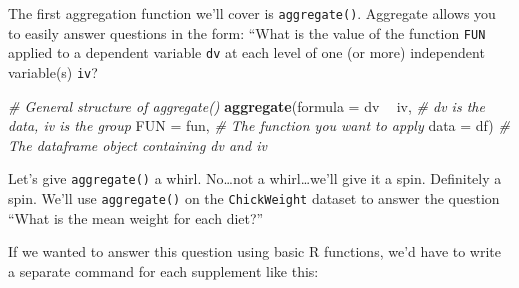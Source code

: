 \documentclass[]{book}
\newenvironment{Shaded}{\begin{snugshade}}{\end{snugshade}}
\newcommand{\KeywordTok}[1]{\textcolor[rgb]{0.13,0.29,0.53}{\textbf{#1}}}
\newcommand{\DataTypeTok}[1]{\textcolor[rgb]{0.13,0.29,0.53}{#1}}
\newcommand{\DecValTok}[1]{\textcolor[rgb]{0.00,0.00,0.81}{#1}}
\newcommand{\StringTok}[1]{\textcolor[rgb]{0.31,0.60,0.02}{#1}}
\newcommand{\CommentTok}[1]{\textcolor[rgb]{0.56,0.35,0.01}{\textit{#1}}}
\newcommand{\OperatorTok}[1]{\textcolor[rgb]{0.81,0.36,0.00}{\textbf{#1}}}
\newcommand{\NormalTok}[1]{#1}
\theoremstyle{definition}
\theoremstyle{definition}
\theoremstyle{remark}
\begin{document}
The first aggregation function we'll cover is \texttt{aggregate()}.
Aggregate allows you to easily answer questions in the form: ``What is
the value of the function \texttt{FUN} applied to a dependent variable
\texttt{dv} at each level of one (or more) independent variable(s)
\texttt{iv}?

\begin{Shaded}
\begin{Highlighting}[]
\CommentTok{# General structure of aggregate()}
\KeywordTok{aggregate}\NormalTok{(}\DataTypeTok{formula =}\NormalTok{ dv }\OperatorTok{~}\StringTok{ }\NormalTok{iv, }\CommentTok{# dv is the data, iv is the group }
          \DataTypeTok{FUN =}\NormalTok{ fun, }\CommentTok{# The function you want to apply}
          \DataTypeTok{data =}\NormalTok{ df) }\CommentTok{# The dataframe object containing dv and iv}
\end{Highlighting}
\end{Shaded}

Let's give \texttt{aggregate()} a whirl. No\ldots{}not a
whirl\ldots{}we'll give it a spin. Definitely a spin. We'll use
\texttt{aggregate()} on the \texttt{ChickWeight} dataset to answer the
question ``What is the mean weight for each diet?''

If we wanted to answer this question using basic R functions, we'd have
to write a separate command for each supplement like this:

\begin{Shaded}
\end{Shaded}
\end{document}
